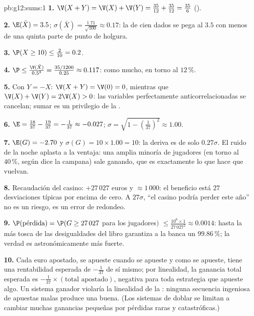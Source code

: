 \begin{solution}{pb:g12:sums:1}
\textbf{1.} $\V(X + Y) = \V(X) + \V(Y) = \frac{35}{12} +
\frac{35}{12} = \frac{35}{6}$ ().

\textbf{2.} $\E(\bar X) = 3.5$;
$\sigma(\bar X) = \frac{1.71}{\sqrt{100}} \approx 0.17$: la  de cien
dados se pega al $3.5$ con menos de una quinta parte de punto de holgura.

\textbf{3.} $\P(X \geq 10) \leq \frac{2}{10} = 0.2$.

\textbf{4.} $\P \leq \frac{\V(\bar X)}{0.5^2} = \frac{35/1200}{0.25}
\approx 0.117$: como mucho, en torno al $12\,\%$.

\textbf{5.} Con $Y = -X$: $\V(X + Y) = \V(0) = 0$, mientras que
$\V(X) + \V(Y) = 2\V(X) > 0$: las variables perfectamente
anticorrelacionadas se cancelan; sumar  es un privilegio de la
.

\textbf{6.} $\E = \frac{18}{37} - \frac{19}{37} = -\frac{1}{37}
\approx -0.027$;
$\sigma = \sqrt{1 - \left(\frac{1}{37}\right)^2} \approx 1.00$.

\textbf{7.} $\E(G) = -2.70$ y $\sigma(G) = 10 \times 1.00 = 10$: la deriva
es de solo $0.27\sigma$. El ruido de la noche aplasta a la ventaja: una
amplia minoría de jugadores (en torno al $40\,\%$, según dice la campana)
sale ganando, que es exactamente lo que hace que vuelvan.

\textbf{8.} Recaudación del casino:  $+27\,027$ euros y  $\approx 1\,000$: el beneficio está $27$ desviaciones típicas por
encima de cero. A $27\sigma$, ``el casino podría perder este año'' no es un
riesgo, es un error de redondeo.

\textbf{9.} $\P(\text{pérdida}) = \P(G \geq 27\,027$ para los
jugadores$)$ $\leq \frac{10^6 \times 1}{27\,027^2} \approx 0.0014$: hasta
la más tosca de las desigualdades del libro garantiza a la banca un
$99.86\,\%$; la verdad es astronómicamente más fuerte.

\textbf{10.} Cada euro apostado, se apueste cuando se apueste y como se
apueste, tiene una rentabilidad esperada de $-\frac{1}{37}$ de sí mismo;
por linealidad, la ganancia total esperada es $-\frac{1}{37} \times
(\text{total apostado})$, negativa para toda estrategia que apueste algo.
Un sistema ganador violaría la linealidad de la : ninguna
secuencia ingeniosa de apuestas malas produce una buena. (Los sistemas de
doblar se limitan a cambiar muchas ganancias pequeñas por pérdidas raras y
catastróficas.)


\end{solution}
